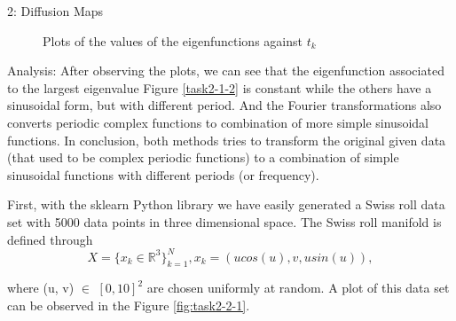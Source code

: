 \documentclass[10pt,a4paper]{article}
\begin{document}
\begin{task}{2: Diffusion Maps}
\begin{figure} [H]
\centering
    \caption{Plots of the values of the eigenfunctions against \(t_k\)}
    \label{d}
\end{figure}

Analysis: After observing the plots, we can see that the eigenfunction associated to the largest eigenvalue Figure \ref{task2-1-2} is constant while the others have a sinusoidal form, but with different period. And the Fourier transformations also converts periodic complex functions to combination of more simple sinusoidal functions. In conclusion, both methods tries to transform the original given data (that used to be complex periodic functions) to a combination of simple sinusoidal functions with different periods (or frequency).

\bigskip


First, with the sklearn Python library we have easily generated a Swiss roll data set with 5000 data points in three dimensional space. The Swiss roll manifold is defined through
\[
X = \{ x_k \in \mathbb R^3 \}_{k=1}^{N}, x_k = (u cos(u), v, u sin(u)),
\]

\noindent where (u, v) \(\in\) \([0, 10]^2\) are chosen uniformly at random. A plot of this data set can be observed in the Figure \ref{fig:task2-2-1}. 


\end{task}
\end{document}
